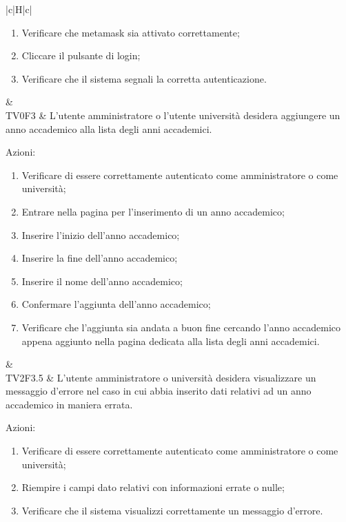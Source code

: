 \begin{longtable}{|c|H|c|}
\begin{flushleft}
			\end{flushleft} 
		\begin{enumerate}
			\item Verificare che metamask sia attivato correttamente;
			\item Cliccare il pulsante di login;
			\item Verificare che il sistema segnali la corretta autenticazione.
		\end{enumerate} & \Ts \\
	\hline
	TV0F3 & L'utente amministratore o l'utente università desidera aggiungere un anno accademico alla lista degli anni accademici. \newline \begin{flushleft}
		Azioni:\newline
			\end{flushleft} 
		\begin{enumerate}
			\item Verificare di essere correttamente autenticato come amministratore o come università;
			\item Entrare nella pagina per l'inserimento di un anno accademico;
			\item Inserire l'inizio dell'anno accademico;
			\item Inserire la fine dell'anno accademico;
			\item Inserire il nome dell'anno accademico;
			\item Confermare l'aggiunta dell'anno accademico;
			\item Verificare che l'aggiunta sia andata a buon fine cercando l'anno accademico appena aggiunto nella pagina dedicata alla lista degli anni accademici.
		\end{enumerate} & \Ts \\ 
	\hline
	TV2F3.5 & L'utente amministratore o università desidera visualizzare un messaggio d'errore nel caso in cui abbia inserito dati relativi ad un anno accademico in maniera errata. \newline \begin{flushleft}
		Azioni:\newline
			\end{flushleft} 
		\begin{enumerate}
			\item Verificare di essere correttamente autenticato come amministratore o come università;
			\item Riempire i campi dato  relativi con informazioni errate o nulle;
			\item Verificare che il sistema visualizzi correttamente un messaggio d'errore.

\end{enumerate}
\end{longtable}
